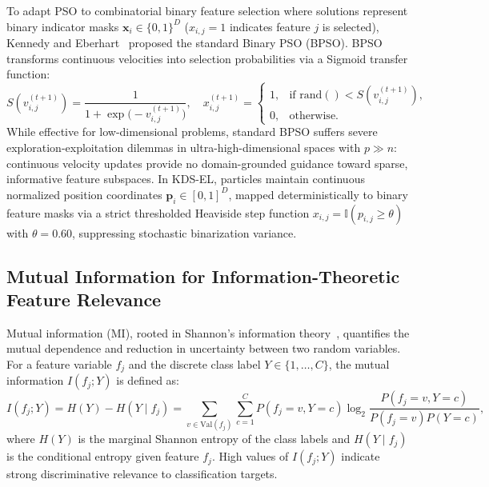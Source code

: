 To adapt PSO to combinatorial binary feature selection where solutions represent binary indicator masks $\mathbf{x}_i \in \{0, 1\}^D$ ($x_{i,j}=1$ indicates feature $j$ is selected), Kennedy and Eberhart~\cite{kennedy1997} proposed the standard Binary PSO (BPSO). BPSO transforms continuous velocities into selection probabilities via a Sigmoid transfer function:
\begin{equation}
S(v_{i,j}^{(t+1)}) = \frac{1}{1 + \exp\bigl(-v_{i,j}^{(t+1)}\bigr)}, \quad
x_{i,j}^{(t+1)} = \begin{cases}
1, & \text{if } \mathrm{rand}() < S(v_{i,j}^{(t+1)}),\\[2pt]
0, & \text{otherwise}.
\end{cases}
\label{eq:bpsosigmoid}
\end{equation}
While effective for low-dimensional problems, standard BPSO suffers severe exploration-exploitation dilemmas in ultra-high-dimensional spaces with $p \gg n$: continuous velocity updates provide no domain-grounded guidance toward sparse, informative feature subspaces. In KDS-EL, particles maintain continuous normalized position coordinates $\mathbf{p}_i \in [0, 1]^D$, mapped deterministically to binary feature masks via a strict thresholded Heaviside step function $x_{i,j} = \mathbb{I}(p_{i,j} \ge \theta)$ with $\theta = 0.60$, suppressing stochastic binarization variance.

\subsection{Mutual Information for Information-Theoretic Feature Relevance}\label{sec:mi-relevance}

Mutual information (MI), rooted in Shannon's information theory~\cite{cover1991}, quantifies the mutual dependence and reduction in uncertainty between two random variables. For a feature variable $f_j$ and the discrete class label $Y \in \{1, \ldots, C\}$, the mutual information $I(f_j; Y)$ is defined as:
\begin{equation}
I(f_j; Y) = H(Y) - H(Y \mid f_j) = \sum_{v \in \mathrm{Val}(f_j)} \sum_{c=1}^C P(f_j = v, Y = c) \log_2 \frac{P(f_j = v, Y = c)}{P(f_j = v) P(Y = c)},
\label{eq:mi}
\end{equation}
where $H(Y)$ is the marginal Shannon entropy of the class labels and $H(Y \mid f_j)$ is the conditional entropy given feature $f_j$. High values of $I(f_j; Y)$ indicate strong discriminative relevance to classification targets.

